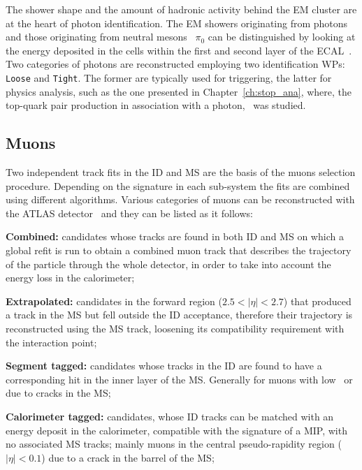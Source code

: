 			The shower shape and the amount of hadronic activity behind the \ac{EM} cluster are at the heart of photon identification. The \ac{EM} showers originating from photons and those originating from neutral mesons \eg\ $\pi_0$ can be distinguished by looking at the energy deposited in the cells within the first and second layer of the \ac{ECAL}~\cite{ATL-PHYS-PUB-2016-014}. Two categories of photons are reconstructed employing two identification \acp{WP}: \texttt{Loose} and \texttt{Tight}. The former are typically used for triggering, the latter for physics analysis, such as the one presented in Chapter~\ref{ch:stop_ana}, where, the top-quark pair production in association with a photon, \ttgamma\ was studied.

		\subsection*{Muons}

			Two independent track fits in the \ac{ID} and \ac{MS} are the basis of the muons selection procedure. Depending on the signature in each sub-system the fits are combined using different algorithms. Various categories of muons can be reconstructed with the \ac{ATLAS} detector~\cite{Aad:2016jkr} and they can be listed as it follows: 

			\begin{description}
				\item \textbf{Combined:} candidates whose tracks are found in both \ac{ID} and \ac{MS} on which a global refit is run to obtain a combined muon track that describes the trajectory of the particle through the whole detector, in order to take into account the energy loss in the calorimeter;

				\item \textbf{Extrapolated:} candidates in the forward region ($2.5 < |\eta| < 2.7$) that produced a track in the \ac{MS} but fell outside the \ac{ID} acceptance, therefore their trajectory is reconstructed using the \ac{MS} track, loosening its compatibility requirement with the interaction point;

				\item \textbf{Segment tagged:} candidates whose tracks in the \ac{ID} are found to have a corresponding hit in the inner layer of the \ac{MS}. Generally for muons with low \pt\ or due to cracks in the \ac{MS};

				\item \textbf{Calorimeter tagged:} candidates, whose \ac{ID} tracks can be matched with an energy deposit in the calorimeter, compatible with the signature of a \ac{MIP}, with no associated \ac{MS} tracks; mainly muons in the central pseudo-rapidity region ($|\eta| < 0.1$) due to a crack in the barrel of the \ac{MS};
			\end{description}

